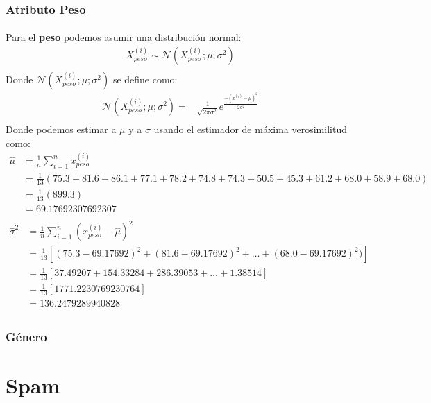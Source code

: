 \documentclass[12pt]{article}
\begin{document}
  \subsubsection{Atributo Peso}
  \paragraph{}Para el \textbf{peso} podemos asumir una distribución normal:
  \begin{equation}
  \begin{split}
  X_{peso}^{(i)}\sim \mathcal{N}(X_{peso}^{(i)};\mu;\sigma^2)\\
  \end{split}
  \end{equation}
  Donde $\mathcal{N}(X_{peso}^{(i)};\mu;\sigma^2)$ se define como:\\
  \begin{equation}
  \begin{split}
  \mathcal{N}(X_{peso}^{(i)};\mu;\sigma^2) =& \frac{1}{\sqrt{2\pi\sigma^2}}e^{\frac{-(x^{(i)} - \mu)^2}{2\sigma^2}}\\
  \end{split}
  \end{equation}
  Donde podemos estimar a $\mu$ y a $\sigma$ usando el estimador de máxima verosimilitud como:
  \begin{equation}
  \begin{split}
  \hat{\mu}&=\frac{1}{n}\sum_{i=1}^{n}{x_{peso}^{(i)}}\\
  &=\frac{1}{13}(75.3 + 81.6 + 86.1 + 77.1 + 78.2 + 74.8 + 74.3 + 50.5 + 45.3 + 61.2 + 68.0 + 58.9 + 68.0)\\
  &=\frac{1}{13}(899.3)\\
  &= 69.17692307692307\\
  \end{split}
  \end{equation}
  \begin{equation}
  \begin{split}
  \hat{\sigma}^2&=\frac{1}{n}\sum_{i=1}^{n}{(x_{peso}^{(i)} - \hat{\mu})^2}\\
  &=\frac{1}{13}[(75.3-69.17692)^2 + (81.6-69.17692)^2  + \dots + (68.0-69.17692)^2)]\\
  &=\frac{1}{13}[37.49207 + 154.33284 + 286.39053 + \dots + 1.38514]\\
  &=\frac{1}{13}[1771.2230769230764]\\
  &= 136.2479289940828\\
  \end{split}
  \end{equation}
  \subsubsection{Género}
  
 \section{Spam}
	 
\end{document}
